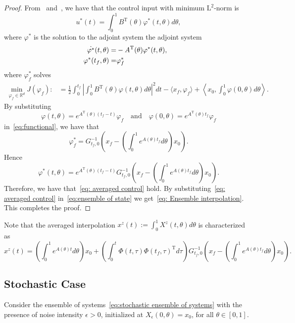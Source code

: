 \documentclass[12pt]{amsart}
\newcommand{\R}{\mathbb{R}}
\renewcommand{\(}{\left (}
\renewcommand{\)}{\right )}
\numberwithin{equation}{section}
\begin{document}
\begin{proof}
From~\cite{ADO:22} and~\cite[Theorem~3]{ZE:14}, we have that the control input with  minimum $\mathrm{L}^2$-norm  is 
\begin{equation}\label{eq: optimal control}
u^*(t)=\int_{0}^{1}B^{\mathrm{T}}(\theta)\varphi^*(t,\theta)d\theta,
\end{equation}
where $\varphi^*$ is the solution to the adjoint system
the adjoint system
\begin{align}\label{eq:adjoint system}
\dot{\varphi^*}(t,\theta)=&-A^{\mathrm{T}}(\theta)\varphi^*(t,\theta),\cr%
\varphi^*(t_f,\theta)=&\varphi_f^*%
\end{align}
where $\varphi^*_f$ solves 
\begin{align}\label{eq:functional}
\min_{\varphi_f\in\R^d} J(\varphi_f):&=\frac{1}{2}\int_{0}^{t_f}\left |\int_{0}^{1} B^{\mathrm{T}}(\theta)\varphi(t,\theta)d\theta\right |^2dt -\langle x_f,\varphi_f\rangle+\left\langle x_0,\int_{0}^{1}\varphi(0,\theta)d\theta\right\rangle.
\end{align}
By substituting 
\[
\varphi(t,\theta)=e^{A^{\mathrm{T}}(\theta)(t_f-t)}\varphi_f\quad\text{and}\quad \varphi(0,\theta)=e^{A^{\mathrm{T}}(\theta)t_f}\varphi_f
\]
in~\eqref{eq:functional}, we have that %
\[
\varphi_f^*=G_{t_f,0}^{-1}\left(x_f-\left(\int_{0}^{1}e^{A(\theta)t_f}d\theta\right) x_0\right).
\]
Hence 
\[
\varphi^*(t,\theta)=e^{A^{\mathrm{T}}(\theta)(t_f-t)}G_{t_f,0}^{-1}\left(x_f-\left(\int_{0}^{1}e^{A(\theta)t_f}d\theta\right) x_0\right).
\]
Therefore, we have that~\eqref{eq: averaged control} hold. By substituting~\eqref{eq: averaged control} in~\eqref{eq:ensemble of state} we get~\eqref{eq: Ensemble interpolation}. This completes the proof.
\end{proof}

Note that the averaged interpolation $x^z(t):=\int_0^1X^z(t,\theta)d\theta$ is characterized as
\begin{equation}\label{eq: averaged interpolation}
x^z(t)=\left(\int_0^1e^{A(\theta)t}d\theta\right) x_0+\left(\int_{0}^{t}\Phi(t,\tau)\Phi(t_f,\tau)^{\mathrm{T}}d\tau\right) G_{t_f,0}^{-1}\left(x_f-\left(\int_{0}^{1}e^{A(\theta)t_f}d\theta\right) x_0\right).    
\end{equation}



\subsection{Stochastic Case}
Consider the ensemble of systems~\eqref{eq:stochastic ensemble of systems} with the presence of noise intensity $\epsilon>0$,
initialized at $X_{\epsilon}(0,\theta)=x_0$, for all $\theta\in[0,1]$. 
\end{document}
